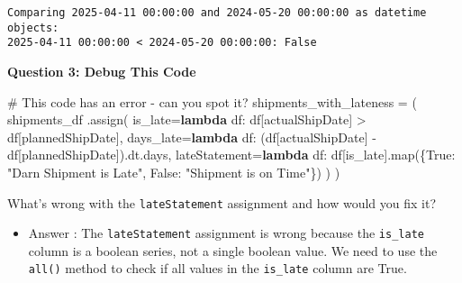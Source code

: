 \documentclass[
  letterpaper,
  DIV=11,
  numbers=noendperiod]{scrartcl}
\newenvironment{Shaded}{\begin{snugshade}}{\end{snugshade}}
\newcommand{\BuiltInTok}[1]{\textcolor[rgb]{0.00,0.23,0.31}{#1}}
\newcommand{\CommentTok}[1]{\textcolor[rgb]{0.37,0.37,0.37}{#1}}
\newcommand{\KeywordTok}[1]{\textcolor[rgb]{0.00,0.23,0.31}{\textbf{#1}}}
\newcommand{\NormalTok}[1]{\textcolor[rgb]{0.00,0.23,0.31}{#1}}
\newcommand{\OperatorTok}[1]{\textcolor[rgb]{0.37,0.37,0.37}{#1}}
\newcommand{\StringTok}[1]{\textcolor[rgb]{0.13,0.47,0.30}{#1}}
\newcommand{\VariableTok}[1]{\textcolor[rgb]{0.07,0.07,0.07}{#1}}
\providecommand{\tightlist}{%
  \setlength{\itemsep}{0pt}\setlength{\parskip}{0pt}}
\begin{document}
\begin{tcolorbox}
\begin{verbatim}
Comparing 2025-04-11 00:00:00 and 2024-05-20 00:00:00 as datetime objects:
2025-04-11 00:00:00 < 2024-05-20 00:00:00: False
\end{verbatim}

\textbf{Question 3: Debug This Code}

\begin{Shaded}
\begin{Highlighting}[]
\CommentTok{\# This code has an error {-} can you spot it?}
\NormalTok{shipments\_with\_lateness }\OperatorTok{=}\NormalTok{ (}
\NormalTok{    shipments\_df}
\NormalTok{    .assign(}
\NormalTok{        is\_late}\OperatorTok{=}\KeywordTok{lambda}\NormalTok{ df: df[}\StringTok{\textquotesingle{}actualShipDate\textquotesingle{}}\NormalTok{] }\OperatorTok{\textgreater{}}\NormalTok{ df[}\StringTok{\textquotesingle{}plannedShipDate\textquotesingle{}}\NormalTok{],}
\NormalTok{        days\_late}\OperatorTok{=}\KeywordTok{lambda}\NormalTok{ df: (df[}\StringTok{\textquotesingle{}actualShipDate\textquotesingle{}}\NormalTok{] }\OperatorTok{{-}}\NormalTok{ df[}\StringTok{\textquotesingle{}plannedShipDate\textquotesingle{}}\NormalTok{]).dt.days,}
\NormalTok{        lateStatement}\OperatorTok{=}\KeywordTok{lambda}\NormalTok{ df: df[}\StringTok{\textquotesingle{}is\_late\textquotesingle{}}\NormalTok{].}\BuiltInTok{map}\NormalTok{(\{}\VariableTok{True}\NormalTok{: }\StringTok{"Darn Shipment is Late"}\NormalTok{, }\VariableTok{False}\NormalTok{: }\StringTok{"Shipment is on Time"}\NormalTok{\})}
\NormalTok{    )}
\NormalTok{)}
\end{Highlighting}
\end{Shaded}

What's wrong with the \texttt{lateStatement} assignment and how would
you fix it?

\end{tcolorbox}

\begin{itemize}
\tightlist
\item
  Answer : The \texttt{lateStatement} assignment is wrong because the
  \texttt{is\_late} column is a boolean series, not a single boolean
  value. We need to use the \texttt{all()} method to check if all values
  in the \texttt{is\_late} column are True.
\end{itemize}
\end{document}
